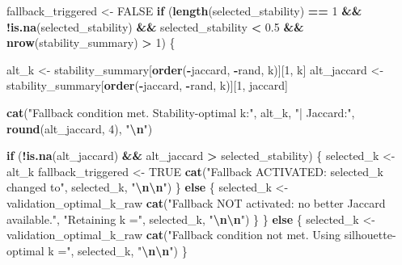 \documentclass[
]{article}
\newenvironment{Shaded}{\begin{snugshade}}{\end{snugshade}}
\newcommand{\ConstantTok}[1]{\textcolor[rgb]{0.56,0.35,0.01}{#1}}
\newcommand{\ControlFlowTok}[1]{\textcolor[rgb]{0.13,0.29,0.53}{\textbf{#1}}}
\newcommand{\DecValTok}[1]{\textcolor[rgb]{0.00,0.00,0.81}{#1}}
\newcommand{\FloatTok}[1]{\textcolor[rgb]{0.00,0.00,0.81}{#1}}
\newcommand{\FunctionTok}[1]{\textcolor[rgb]{0.13,0.29,0.53}{\textbf{#1}}}
\newcommand{\NormalTok}[1]{#1}
\newcommand{\OtherTok}[1]{\textcolor[rgb]{0.56,0.35,0.01}{#1}}
\newcommand{\SpecialCharTok}[1]{\textcolor[rgb]{0.81,0.36,0.00}{\textbf{#1}}}
\newcommand{\StringTok}[1]{\textcolor[rgb]{0.31,0.60,0.02}{#1}}
\begin{document}
\begin{Shaded}
\begin{Highlighting}[]
\NormalTok{fallback\_triggered }\OtherTok{\textless{}{-}} \ConstantTok{FALSE}
\ControlFlowTok{if}\NormalTok{ (}\FunctionTok{length}\NormalTok{(selected\_stability) }\SpecialCharTok{==} \DecValTok{1} \SpecialCharTok{\&\&}
    \SpecialCharTok{!}\FunctionTok{is.na}\NormalTok{(selected\_stability) }\SpecialCharTok{\&\&}
\NormalTok{    selected\_stability }\SpecialCharTok{\textless{}} \FloatTok{0.5} \SpecialCharTok{\&\&}
    \FunctionTok{nrow}\NormalTok{(stability\_summary) }\SpecialCharTok{\textgreater{}} \DecValTok{1}\NormalTok{) \{}

\NormalTok{  alt\_k       }\OtherTok{\textless{}{-}}\NormalTok{ stability\_summary[}\FunctionTok{order}\NormalTok{(}\SpecialCharTok{{-}}\NormalTok{jaccard, }\SpecialCharTok{{-}}\NormalTok{rand, k)][}\DecValTok{1}\NormalTok{, k]}
\NormalTok{  alt\_jaccard }\OtherTok{\textless{}{-}}\NormalTok{ stability\_summary[}\FunctionTok{order}\NormalTok{(}\SpecialCharTok{{-}}\NormalTok{jaccard, }\SpecialCharTok{{-}}\NormalTok{rand, k)][}\DecValTok{1}\NormalTok{, jaccard]}

  \FunctionTok{cat}\NormalTok{(}\StringTok{"Fallback condition met. Stability{-}optimal k:"}\NormalTok{, alt\_k,}
      \StringTok{"| Jaccard:"}\NormalTok{, }\FunctionTok{round}\NormalTok{(alt\_jaccard, }\DecValTok{4}\NormalTok{), }\StringTok{"}\SpecialCharTok{\textbackslash{}n}\StringTok{"}\NormalTok{)}

  \ControlFlowTok{if}\NormalTok{ (}\SpecialCharTok{!}\FunctionTok{is.na}\NormalTok{(alt\_jaccard) }\SpecialCharTok{\&\&}\NormalTok{ alt\_jaccard }\SpecialCharTok{\textgreater{}}\NormalTok{ selected\_stability) \{}
\NormalTok{    selected\_k         }\OtherTok{\textless{}{-}}\NormalTok{ alt\_k}
\NormalTok{    fallback\_triggered }\OtherTok{\textless{}{-}} \ConstantTok{TRUE}
    \FunctionTok{cat}\NormalTok{(}\StringTok{"Fallback ACTIVATED: selected\_k changed to"}\NormalTok{, selected\_k, }\StringTok{"}\SpecialCharTok{\textbackslash{}n\textbackslash{}n}\StringTok{"}\NormalTok{)}
\NormalTok{  \} }\ControlFlowTok{else}\NormalTok{ \{}
\NormalTok{    selected\_k }\OtherTok{\textless{}{-}}\NormalTok{ validation\_optimal\_k\_raw}
    \FunctionTok{cat}\NormalTok{(}\StringTok{"Fallback NOT activated: no better Jaccard available."}\NormalTok{,}
        \StringTok{"Retaining k ="}\NormalTok{, selected\_k, }\StringTok{"}\SpecialCharTok{\textbackslash{}n\textbackslash{}n}\StringTok{"}\NormalTok{)}
\NormalTok{  \}}
\NormalTok{\} }\ControlFlowTok{else}\NormalTok{ \{}
\NormalTok{  selected\_k }\OtherTok{\textless{}{-}}\NormalTok{ validation\_optimal\_k\_raw}
  \FunctionTok{cat}\NormalTok{(}\StringTok{"Fallback condition not met. Using silhouette{-}optimal k ="}\NormalTok{,}
\NormalTok{      selected\_k, }\StringTok{"}\SpecialCharTok{\textbackslash{}n\textbackslash{}n}\StringTok{"}\NormalTok{)}
\NormalTok{\}}
\end{Highlighting}
\end{Shaded}
\end{document}
